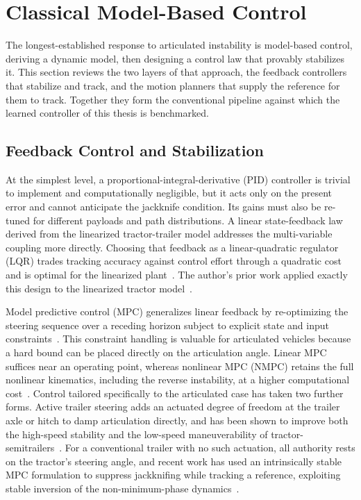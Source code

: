 \section{Classical Model-Based Control}

The longest-established response to articulated instability is model-based control, deriving a dynamic model, then designing a control law that provably stabilizes it. This section reviews the two layers of that approach, the feedback controllers that stabilize and track, and the motion planners that supply the reference for them to track. Together they form the conventional pipeline against which the learned controller of this thesis is benchmarked.

\subsection{Feedback Control and Stabilization}
At the simplest level, a proportional-integral-derivative (PID) controller is trivial to implement and computationally negligible, but it acts only on the present error and cannot anticipate the jackknife condition. Its gains must also be re-tuned for different payloads and path distributions. A linear state-feedback law derived from the linearized tractor-trailer model addresses the multi-variable coupling more directly. Choosing that feedback as a linear-quadratic regulator (LQR) trades tracking accuracy against control effort through a quadratic cost and is optimal for the linearized plant~\cite{anderson1990optimal}. The author's prior work applied exactly this design to the linearized tractor model~\cite{schnapp2024ece682}.

Model predictive control (MPC) generalizes linear feedback by re-optimizing the steering sequence over a receding horizon subject to explicit state and input constraints~\cite{rawlings2017mpc}. This constraint handling is valuable for articulated vehicles because a hard bound can be placed directly on the articulation angle. Linear MPC suffices near an operating point, whereas nonlinear MPC (NMPC) retains the full nonlinear kinematics, including the reverse instability, at a higher computational cost~\cite{mayne2000constrained}. Control tailored specifically to the articulated case has taken two further forms. Active trailer steering adds an actuated degree of freedom at the trailer axle or hitch to damp articulation directly, and has been shown to improve both the high-speed stability and the low-speed maneuverability of tractor-semitrailers~\cite{odhams2011active, jujnovich2013path}. For a conventional trailer with no such actuation, all authority rests on the tractor's steering angle, and recent work has used an intrinsically stable MPC formulation to suppress jackknifing while tracking a reference, exploiting stable inversion of the non-minimum-phase dynamics~\cite{beglini2020antijackknife}.

